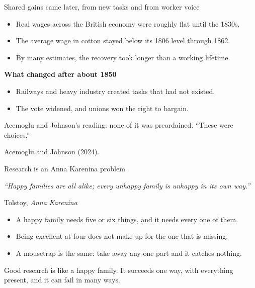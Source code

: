 \documentclass[aspectratio=169,11pt]{beamer}
\begin{document}
\begin{frame}{Shared gains came later, from new tasks and from worker voice}

\begin{itemize}\setlength\itemsep{0.4em}
    \item Real wages across the British economy were roughly flat until the 1830s.
    \item The average wage in cotton stayed below its 1806 level through 1862.
    \item By many estimates, the recovery took longer than a working lifetime.
\end{itemize}

\vspace{0.25cm}

\textbf{What changed after about 1850}
\begin{itemize}\setlength\itemsep{0.3em}
    \item Railways and heavy industry created tasks that had not existed.
    \item The vote widened, and unions won the right to bargain.
\end{itemize}

\vspace{0.3cm}

\alert{Acemoglu and Johnson's reading: none of it was preordained. ``These were choices.''}

\vspace{0.05cm}
{\scriptsize\color{warmgray}Acemoglu and Johnson (2024).}

\end{frame}

\begin{frame}{Research is an Anna Karenina problem}

\begin{center}
{\large\itshape ``Happy families are all alike; every unhappy family is unhappy in its own way.''}

\vspace{0.1cm}
{\small\color{warmgray}Tolstoy, \emph{Anna Karenina}}
\end{center}

\vspace{0.3cm}

\begin{itemize}\setlength\itemsep{0.35em}
    \item A happy family needs five or six things, and it needs every one of them.
    \item Being excellent at four does not make up for the one that is missing.
    \item A mousetrap is the same: take away any one part and it catches nothing.
\end{itemize}

\vspace{0.35cm}

\alert{Good research is like a happy family. It succeeds one way, with everything present, and it can fail in many ways.}

\end{frame}
\end{document}
